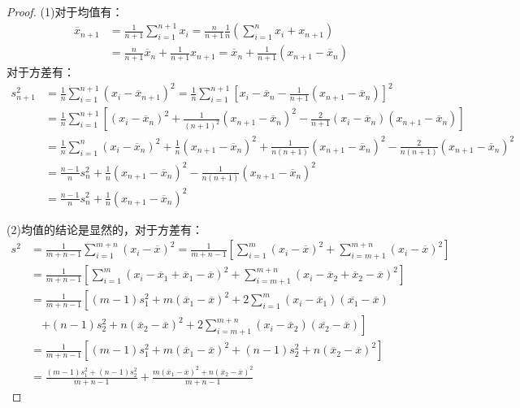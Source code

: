 \begin{proof}
	(1)对于均值有：
	\begin{align*}
		\overline{x}_{n+1}&=\frac{1}{n+1}\sum_{i=1}^{n+1}x_i=\frac{n}{n+1}\frac{1}{n}\left(\sum_{i=1}^{n}x_i+x_{n+1}\right) \\
		&=\frac{n}{n+1}\overline{x}_n+\frac{1}{n+1}x_{n+1}=\overline{x}_n+\frac{1}{n+1}(x_{n+1}-\overline{x}_n)
	\end{align*}
	对于方差有：
	\begin{align*}
		s_{n+1}^2&=\frac{1}{n}\sum_{i=1}^{n+1}(x_i-\overline{x}_{n+1})^2=\frac{1}{n}\sum_{i=1}^{n+1}\left[x_i-\overline{x}_n-\frac{1}{n+1}(x_{n+1}-\overline{x}_n)\right]^2 \\
		&=\frac{1}{n}\sum_{i=1}^{n+1}\left[(x_i-\overline{x}_n)^2+\frac{1}{(n+1)^2}(x_{n+1}-\overline{x}_n)^2-\frac{2}{n+1}(x_i-\overline{x}_n)(x_{n+1}-\overline{x}_n)\right] \\
		&=\frac{1}{n}\sum_{i=1}^{n}(x_i-\overline{x}_n)^2+\frac{1}{n}(x_{n+1}-\overline{x}_n)^2+\frac{1}{n(n+1)}(x_{n+1}-\overline{x}_n)^2-\frac{2}{n(n+1)}(x_{n+1}-\overline{x}_n)^2 \\
		&=\frac{n-1}{n}s_n^2+\frac{1}{n}(x_{n+1}-\overline{x}_n)^2-\frac{1}{n(n+1)}(x_{n+1}-\overline{x}_n)^2 \\
		&=\frac{n-1}{n}s_n^2+\frac{1}{n}(x_{n+1}-\overline{x}_n)^2
	\end{align*}\par
	(2)均值的结论是显然的，对于方差有：
	\begin{align*}
		s^2&=\frac{1}{m+n-1}\sum_{i=1}^{m+n}(x_i-\overline{x})^2=\frac{1}{m+n-1}\left[\sum_{i=1}^{m}(x_i-\overline{x})^2+\sum_{i=m+1}^{m+n}(x_i-\overline{x})^2\right] \\
		&=\frac{1}{m+n-1}\left[\sum_{i=1}^{m}(x_i-\overline{x}_1+\overline{x}_1-\overline{x})^2+\sum_{i=m+1}^{m+n}(x_i-\overline{x}_2+\overline{x}_2-\overline{x})^2\right] \\
		&=\frac{1}{m+n-1}\left[(m-1)s_1^2+m(\overline{x}_1-\overline{x})^2+2\sum_{i=1}^{m}(x_i-\overline{x}_1)(\overline{x_1}-\overline{x})\right. \\
		&\quad\left.+(n-1)s_2^2+n(\overline{x}_2-\overline{x})^2+2\sum_{i=m+1}^{m+n}(x_i-\overline{x}_2)(\overline{x_2}-\overline{x})\right] \\
		&=\frac{1}{m+n-1}\left[(m-1)s_1^2+m(\overline{x}_1-\overline{x})^2+(n-1)s_2^2+n(\overline{x}_2-\overline{x})^2\right] \\
		&=\frac{(m-1)s_1^2+(n-1)s_2^2}{m+n-1}+\frac{m(\overline{x}_1-\overline{x})^2+n(\overline{x}_2-\overline{x})^2}{m+n-1}

\end{align*}
\end{proof}
